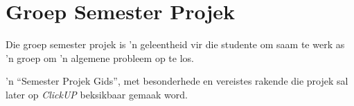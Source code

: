 \section{Groep Semester Projek}
        Die groep semester projek is 'n geleentheid vir die studente om saam te
        werk as 'n groep om 'n algemene probleem op te los.
        
        'n ``Semester Projek Gids'', met besonderhede en vereistes rakende die projek
        sal later op \textit{ClickUP} beksikbaar gemaak word.